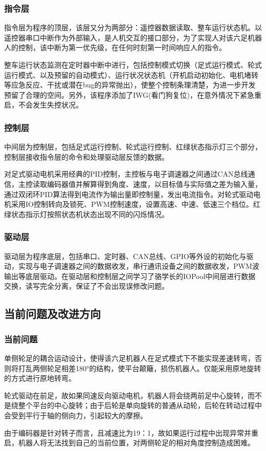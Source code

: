 \documentclass[12pt]{article}
\begin{document}
\begin{CJK}{UTF8}{song}
\subsubsection{指令层}
指令层为程序的顶层，该层又分为两部分：遥控器数据读取、整车运行状态机。以遥控器串口中断作为外部输入，是人机交互的接口部分，为了实现人对该六足机器人的控制，该中断为第一优先级，在任何时刻第一时间响应人的指令。\par
整车运行状态监测在定时器中断中进行，包括控制模式切换（足式运行模式、轮式运行模式、以及预留的自动模式）、运行状况状态机（开机启动初始化、电机堵转等应急反应、干扰或潜在bug的异常抛出），使整个控制条理清楚，为进一步开发预留了合理的空间。另外，该程序添加了IWG(看门狗复位)，在意外情况下紧急重启，不会发生失控状况。
\subsubsection{控制层}
中间层为控制层，包括足式运行控制、轮式运行控制、红绿状态指示灯三个部分，控制层接收指令层的命令和处理驱动层反馈的数据。\par
对足式驱动电机采用经典的PID控制，主控板与电子调速器之间通过CAN总线通信，主控读取编码器值并解算得到角度、速度，以目标值与实际值之差为输入量，通过双闭环PID算法得到电流作为输出量即控制量，发出电流指令。对轮式驱动电机采用IO控制转向及锁死、PWM控制速度，设置高速、中速、低速三个档位。红绿状态指示灯按照状态机状态出现不同的闪烁情况。
\subsubsection{驱动层}
驱动层为程序底层，包括串口、定时器、CAN总线、GPIO等外设的初始化与驱动，实现与电子调速器之间的数据收发，串行通讯设备之间的数据收发，PWM波输出等底层驱动。在驱动层和控制层之间学习了骆学长的IOPool中间层进行数据交换，读写完全分离，保证了不会出现误修改问题。
\subsection{当前问题及改进方向}
\subsubsection{当前问题}
单侧轮足的耦合运动设计，使得该六足机器人在足式模式下不能实现差速转弯，否则将打乱两侧轮足相差180°的结构，使平台颠簸，损伤机器人。仅能采用原地旋转的方式进行原地转弯。\par
轮式驱动在前足，故如果同速反向驱动电机，机器人将会绕两前足中心旋转，而不是绕整个平台的中心旋转；由于后轮是单向旋转的普通从动轮，后轮在转动过程中会受到平行于轴的侧向力，引起较大的摩擦。\par
由于编码器是针对转子而言，且减速比为19：1，故如果运行过程中出现异常并重启，机器人将无法找到自己的当前位置，对两侧轮足的相对角度控制造成困难。

\end{CJK}
\end{document}
